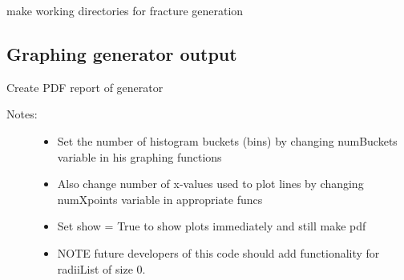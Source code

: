 \documentclass[letterpaper,10pt,english]{sphinxmanual}
\begin{document}

\begin{fulllineitems}
\label{pydfnworks:pydfnworks.generator.make_working_directory}
make working directories for fracture generation

\end{fulllineitems}



\subsection{Graphing generator output}
\label{pydfnworks:module-pydfnworks.gen_output}\label{pydfnworks:graphing-generator-output}

\begin{fulllineitems}
\label{pydfnworks:pydfnworks.gen_output.output_report}
Create PDF report of generator
\begin{description}
\item[{Notes:}] \leavevmode\begin{itemize}
\item {} 
Set the number of histogram buckets (bins) by changing numBuckets variable in his graphing functions

\item {} 
Also change number of x-values used to plot lines by changing numXpoints variable in appropriate funcs

\item {} 
Set show = True to show plots immediately and still make pdf

\item {} 
NOTE future developers of this code should add functionality for radiiList of size 0.

\end{itemize}

\end{description}

\end{fulllineitems}
\end{document}
